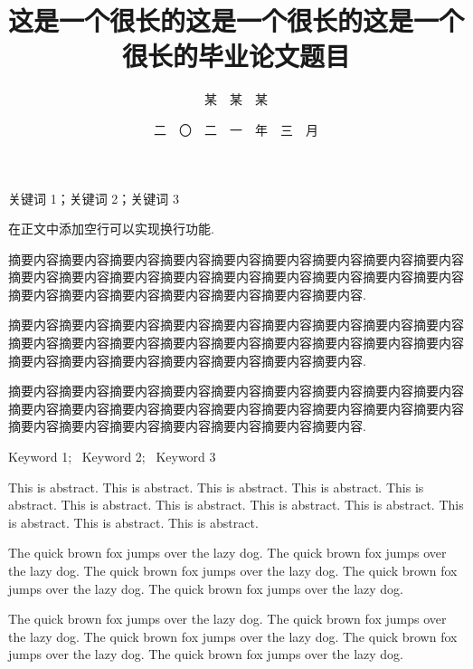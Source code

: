 \documentclass[master,print]{shnuthesis}
\title{这是一个很长的这是一个很长的这是一个很长的毕业论文题目}
\author{某~~某~~某}     %
\date{二~~〇~~二~~一~~年~~三~~月 }  %
\begin{document}
\frontmatter

\maketitle


% 

\makestatement


\clearpage   %



\begin{cnabstract}{关键词 1；关键词 2；关键词 3}

在正文中添加空行可以实现换行功能.

摘要内容摘要内容摘要内容摘要内容摘要内容摘要内容摘要内容摘要内容摘要内容摘要内容摘要内容摘要内容摘要内容摘要内容摘要内容摘要内容摘要内容摘要内容摘要内容摘要内容摘要内容摘要内容摘要内容摘要内容摘要内容.

摘要内容摘要内容摘要内容摘要内容摘要内容摘要内容摘要内容摘要内容摘要内容摘要内容摘要内容摘要内容摘要内容摘要内容摘要内容摘要内容摘要内容摘要内容摘要内容摘要内容摘要内容摘要内容摘要内容摘要内容摘要内容.

摘要内容摘要内容摘要内容摘要内容摘要内容摘要内容摘要内容摘要内容摘要内容摘要内容摘要内容摘要内容摘要内容摘要内容摘要内容摘要内容摘要内容摘要内容摘要内容摘要内容摘要内容摘要内容摘要内容摘要内容摘要内容.


\end{cnabstract}



\begin{enabstract}{Keyword 1;~ Keyword 2;~ Keyword 3}

This is abstract. This is abstract. This is abstract. This is abstract. This is abstract. This is abstract. This is abstract. This is abstract. This is abstract. This is abstract. This is abstract. This is abstract.

The quick brown fox jumps over the lazy dog. The quick brown fox jumps over the lazy dog. The quick brown fox jumps over the lazy dog. The quick brown fox jumps over the lazy dog. The quick brown fox jumps over the lazy dog.

The quick brown fox jumps over the lazy dog. The quick brown fox jumps over the lazy dog. The quick brown fox jumps over the lazy dog. The quick brown fox jumps over the lazy dog. The quick brown fox jumps over the lazy dog.


\end{enabstract}
\end{document}
